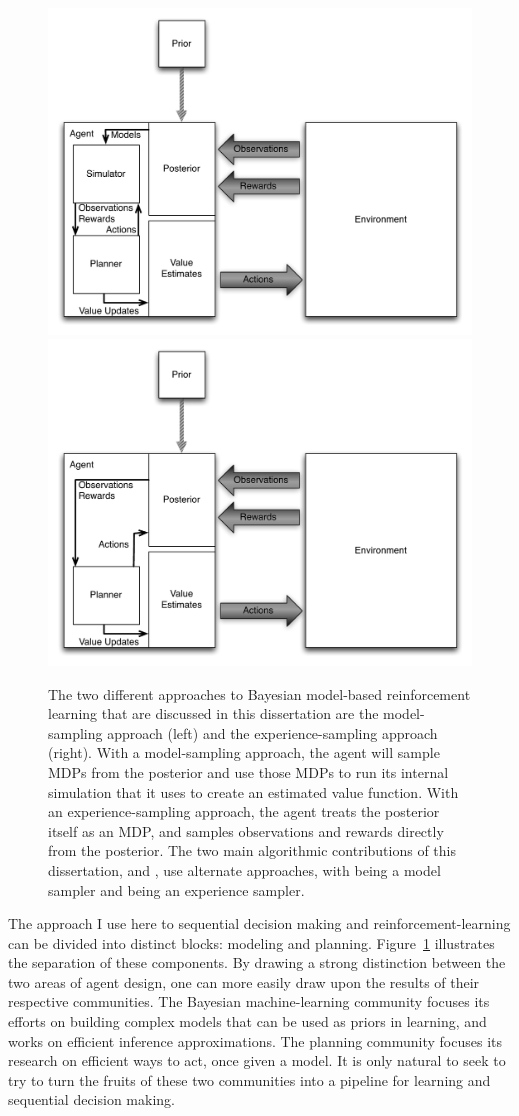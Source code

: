 \begin{figure}[t]
\begin{center}
\includegraphics[width=0.49\linewidth]{figures/model_agent.pdf} \includegraphics[width=0.49\linewidth]{figures/expr_agent.pdf}
\caption{The two different approaches to Bayesian model-based reinforcement learning that are discussed in this dissertation are the model-sampling approach (left) and the experience-sampling approach (right). With a model-sampling approach, the agent will sample MDPs from the posterior and use those MDPs to run its internal simulation that it uses to create an estimated value function. With an experience-sampling approach, the agent treats the posterior itself as an MDP, and samples observations and rewards directly from the posterior. The two main algorithmic contributions of this dissertation,  and , use alternate approaches, with  being a model sampler and  being an experience sampler.}
\label{sec:intro:agent-blocks}
\end{center}
\end{figure}

The approach I use here to sequential decision making and reinforcement-learning can be divided into distinct blocks: modeling and planning. Figure~\ref{sec:intro:agent-blocks} illustrates the separation of these components. By drawing a strong distinction between the two areas of agent design, one can more easily draw upon the results of their respective communities. The Bayesian machine-learning community focuses its efforts on building complex models that can be used as priors in learning, and works on efficient inference approximations. The planning community focuses its research on efficient ways to act, once given a model. It is only natural to seek to try to turn the fruits of these two communities into a pipeline for learning and sequential decision making.

